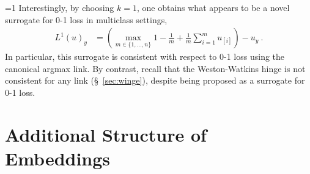 \documentclass[twoside,11pt]{article}
\newcommand{\Comments}{1}
\newcommand{\CommentsR}{1}
\newcommand{\mynote}[2]{\ifnum\Comments=1\textcolor{#1}{#2}\fi}
\newcommand{\reviewerresponse}[2]{\ifnum\CommentsR=1%
  \todo[linecolor=#1!80!black,backgroundcolor=#1,bordercolor=#1!80!black]{#2}\fi}
\newcommand{\jessie}[1]{\mynote{teal}{[JF: #1]}}
\newcommand{\reviewertwo}[1]{\reviewerresponse{blue!20!white}{R2: #1}}
\newcommand{\prop}[1]{\mathrm{prop}[#1]}
\newcommand{\elltopk}{\ell^{\text{top-$k$}}}
\begin{document}



\reviewertwo{C}
Interestingly, by choosing $k=1$, one obtains what appears to be a novel surrogate for 0-1 loss in multiclass settings,
\begin{align*}
	L^1(u)_y &= \left(\max_{m\in\{1,\ldots,n\}} 1 - \frac{1}{m} + \frac 1 m \sum_{i=1}^m u_{[i]} \right) - u_y~.
\end{align*}
In particular, this surrogate is consistent with respect to 0-1 loss using the canonical argmax link.
By contrast, recall that the Weston-Watkins hinge is not consistent for any link (\S~\ref{sec:winge}), despite being proposed as a surrogate for 0-1 loss.


\section{Additional Structure of Embeddings}
\label{sec:min-rep-sets}
\end{document}
